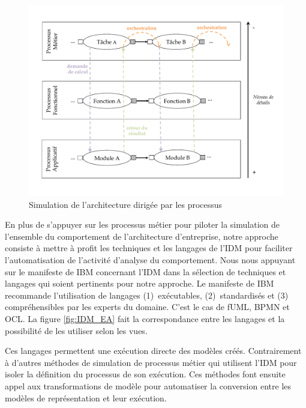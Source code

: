 \begin{figure}[!ht]
    \begin{center}
        \includegraphics[trim= 0cm 3cm 0cm 0cm, width=1\textwidth]{figures/4_demarche/approche_simulation.pdf}
    \end{center}
    \caption{Simulation de l'architecture dirigée par les processus}
    \label{fig:Simulation_Approche}
\end{figure}

En plus de s'appuyer sur les processus métier pour piloter la simulation de
l'ensemble du comportement de l'architecture d'entreprise, notre approche
consiste à mettre à profit les techniques et les langages de l'IDM pour
faciliter l'automatisation de l'activité d'analyse du comportement. Nous nous
appuyant sur le manifeste de IBM \cite{chesbrough2006research} concernant l'IDM
dans la sélection de techniques et langages qui soient pertinents pour notre
approche. Le manifeste de IBM recommande l'utilisation de langages
(1)~exécutables, (2)~standardisés et (3) compréhensibles par les experts du
domaine. C'est le cas de fUML, BPMN et OCL. La figure \ref{fig:IDM_EA} fait la
correspondance entre les langages et la possibilité de les utiliser selon les
vues.


Ces langages permettent une exécution directe des modèles créés. Contrairement à
d'autres méthodes de simulation de processus métier qui utilisent l'IDM pour
isoler la définition du processus de son exécution. Ces méthodes font ensuite
appel aux transformations de modèle pour automatiser la conversion entre les
modèles de représentation et leur exécution.


